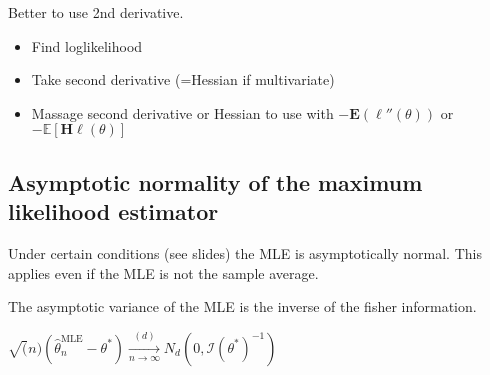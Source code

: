Better to use 2nd derivative.\\

\begin{itemize}
  \item Find loglikelihood
  \item Take second derivative (=Hessian if multivariate)
  \item Massage second derivative or Hessian to use with $- \mathbf{E}(\ell ''(\theta ))$ or $-\mathbb E\left[\mathbf{H}\ell (\theta )\right]$
\end{itemize}

\subsection*{Asymptotic normality of the maximum likelihood estimator}

Under certain conditions (see slides) the MLE is asymptotically normal. This applies even if the MLE is not the sample average.

The asymptotic variance of the MLE is the inverse of the fisher information.

$\sqrt(n)(\widehat{\theta }_ n^{\text {MLE}} - \theta^*) \xrightarrow[n \rightarrow \infty]{(d)} N_d(0,\mathcal{I}(\theta^* )^{-1})$\\
